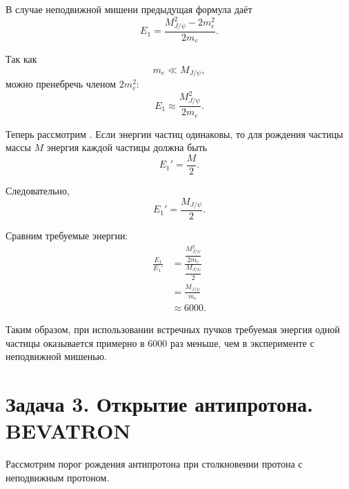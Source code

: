 \documentclass[../final.tex]{subfiles}
\begin{document}
В случае неподвижной мишени предыдущая формула даёт
%
\begin{equation*}
    E_1
    =
    \frac{
        M_{J/\psi}^2-2m_e^2
    }{
        2m_e
    }.
\end{equation*}

Так как
%
\begin{equation*}
    m_e\ll M_{J/\psi},
\end{equation*}
%
можно пренебречь членом $2m_e^2$:
%
\begin{equation*}
    E_1
    \approx
    \frac{
        M_{J/\psi}^2
    }{
        2m_e
    }.
\end{equation*}

Теперь рассмотрим .
Если энергии частиц одинаковы, то для рождения частицы массы $M$
энергия каждой частицы должна быть
%
\begin{equation*}
    E_1'
    =
    \frac{M}{2}.
\end{equation*}

Следовательно,
%
\begin{equation*}
    E_1'
    =
    \frac{
        M_{J/\psi}
    }{2}.
\end{equation*}

Сравним требуемые энергии:
%
\begin{align*}
    \frac{E_1}{E_1'}
    &=
    \frac{
        \dfrac{M_{J/\psi}^2}{2m_e}
    }{
        \dfrac{M_{J/\psi}}{2}
    }
    \\[4pt]
    &=
    \frac{
        M_{J/\psi}
    }{
        m_e
    }
    \\[4pt]
    &\approx
    6000.
\end{align*}

Таким образом, при использовании встречных пучков требуемая энергия
одной частицы оказывается примерно в $6000$ раз меньше, чем
в эксперименте с неподвижной мишенью.



\newpage
\section{Задача 3. Открытие антипротона. BEVATRON}

Рассмотрим порог рождения антипротона при столкновении протона
с неподвижным протоном.
\end{document}
